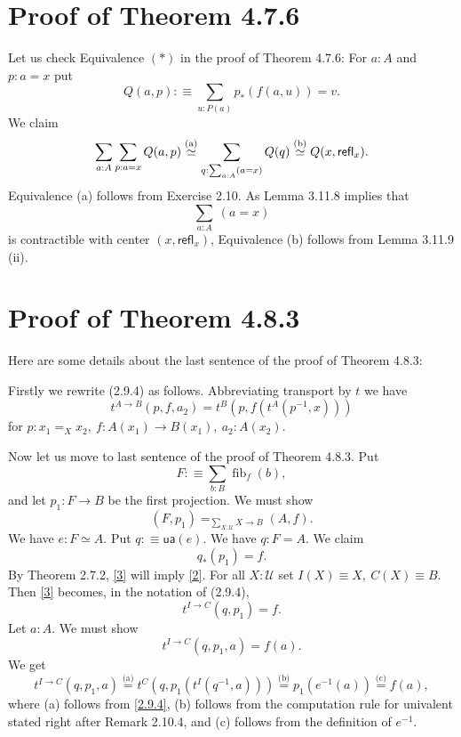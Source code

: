 \documentclass[12pt]{article}
\newcommand{\nn}{\noindent}
\newcommand{\oo}{\operatorname}
\newcommand{\refl}{\mathsf{refl}}
\newcommand{\two}{\mathbf2}
\newcommand{\U}{\mathcal U}
\newcommand{\ua}{\mathsf{ua}}
\begin{document}




\section{Proof of Theorem 4.7.6}

Let us check Equivalence $(*)$ in the proof of Theorem 4.7.6: For $a:A$ and $p:a=x$ put 
$$
Q(a,p):\equiv\sum_{u:P(a)}p_*(f(a,u))=v.
$$ 
We claim 
$$
\sum_{a:A}\sum_{p:a=x}Q(a,p)\overset{(\text a)}{\simeq}
\sum_{q:\sum_{a:A}(a=x)}Q(q)\overset{(\text b)}{\simeq}
Q(x,\refl_x).
$$
Equivalence (a) follows from Exercise 2.10. As Lemma 3.11.8 implies that $$\sum_{a:A}\ (a=x)$$ is contractible with center $(x,\refl_x)$, Equivalence (b) follows from Lemma 3.11.9 (ii). 


\section{Proof of Theorem 4.8.3}

Here are some details about the last sentence of the proof of Theorem 4.8.3:

Firstly we rewrite (2.9.4) as follows. Abbreviating transport by $t$ we have 
\begin{equation}\label{2.9.4}
t^{A\to B}(p,f,a_2)=t^B(p,f(t^A(p^{-1},x)))
\end{equation}
for $p:x_1=_Xx_2,\ f:A(x_1)\to B(x_1),\ a_2:A(x_2)$. 

Now let us move to last sentence of the proof of Theorem 4.8.3. Put
$$
F:\equiv\sum_{b:B}\oo{fib}_f(b),
$$ 
and let $p_1:F\to B$ be the first projection. We must show 
\begin{equation}\label{2}
(F,p_1)=_{\sum_{X:\U}X\to B}(A,f).
\end{equation} 
We have $e:F\simeq A$. Put $q:\equiv\ua(e)$. We have $q:F=A$. We claim 
\begin{equation}\label{3}
q_*(p_1)=f.
\end{equation} 
By Theorem 2.7.2, \eqref{3} will imply \eqref{2}. For all $X:\U$ set $I(X)\equiv X,\ C(X)\equiv B$. Then \eqref{3} becomes, in the notation of (2.9.4), 
$$
t^{I\to C}(q,p_1)=f.
$$ 
Let $a:A$. We must show 
$$
t^{I\to C}(q,p_1,a)=f(a).
$$ 
We get 
$$
t^{I\to C}(q,p_1,a)\overset{\text{(a)}}=t^C(q,p_1(t^I(q^{-1},a)))\overset{\text{(b)}}=p_1(e^{-1}(a))\overset{\text{(c)}}=f(a),
$$ 
where (a) follows from \eqref{2.9.4}, (b) follows from the computation rule for univalent stated right after Remark 2.10.4, and (c) follows from the definition of $e^{-1}$.
\end{document}
